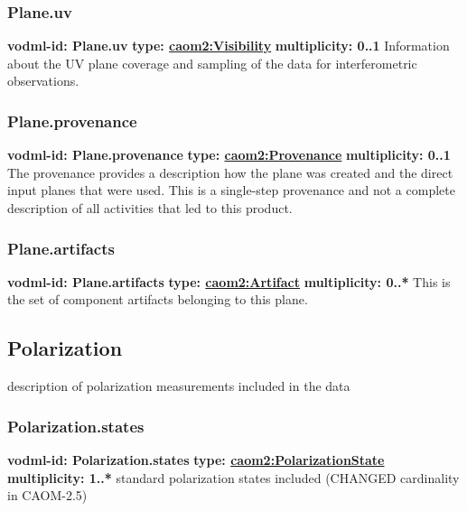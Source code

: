     \subsubsection{Plane.uv}
      \textbf{vodml-id: Plane.uv} \newline
      \textbf{type: \hyperref[sect:Visibility]{caom2:Visibility}} \newline
      \textbf{multiplicity: 0..1} \newline
      Information about the UV plane coverage and sampling of the data for interferometric observations.

    \subsubsection{Plane.provenance}
      \textbf{vodml-id: Plane.provenance} \newline
      \textbf{type: \hyperref[sect:Provenance]{caom2:Provenance}} \newline
      \textbf{multiplicity: 0..1} \newline
      The provenance provides a description how the plane was created and the direct input planes that were used. This is a single-step provenance and not a complete description of all activities that led to this product.

    \subsubsection{Plane.artifacts}
      \textbf{vodml-id: Plane.artifacts} \newline
      \textbf{type: \hyperref[sect:Artifact]{caom2:Artifact}} \newline
      \textbf{multiplicity: 0..*} \newline
      This is the set of component artifacts belonging to this plane.

  \subsection{Polarization}
  \label{sect:Polarization}
    description of polarization measurements included in the data

    \subsubsection{Polarization.states}
      \textbf{vodml-id: Polarization.states} \newline
      \textbf{type: \hyperref[sect:PolarizationState]{caom2:PolarizationState}} \newline
      \textbf{multiplicity: 1..*} \newline
      standard polarization states included (CHANGED cardinality in CAOM-2.5)


